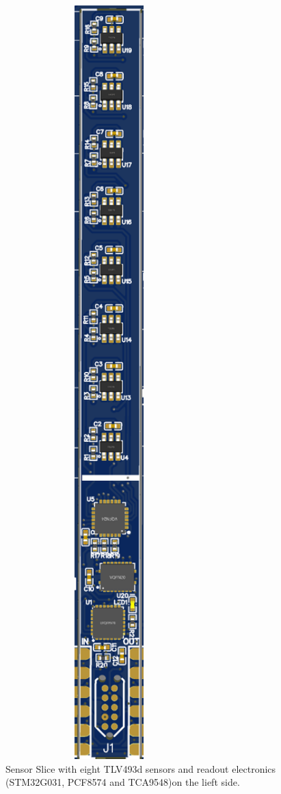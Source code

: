 \documentclass[conference]{IEEEtran}
\begin{document}
\begin{figure}[htbp]
\centerline{\includegraphics[width=8cm]{magcam_sensor_module.png}}
\caption{Sensor Slice with eight TLV493d sensors and readout electronics (STM32G031, PCF8574 and TCA9548)on the lieft side.}
\label{magcam_sensor_module_fig}
\end{figure}
\end{document}
